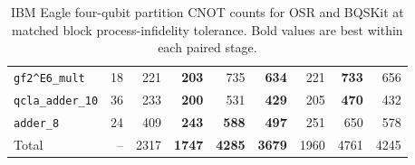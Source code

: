 \begin{table}[p]
\begin{tabular}{lrr|rrr|rrr}
\texttt{gf2\textasciicircum{}E6\_mult} & 18 & 221 & \textbf{203} & 735 & \textbf{634} & 221 & \textbf{733} & 656 \\
\texttt{qcla\_adder\_10} & 36 & 233 & \textbf{200} & 531 & \textbf{429} & 205 & \textbf{470} & 432 \\
\texttt{adder\_8} & 24 & 409 & \textbf{243} & \textbf{588} & \textbf{497} & 251 & 650 & 578 \\
\hline
Total & -- & 2317 & \textbf{1747} & \textbf{4285} & \textbf{3679} & 1960 & 4761 & 4245 \\
\hline
\end{tabular}
\caption{IBM Eagle four-qubit partition CNOT counts for OSR and BQSKit at matched block process-infidelity tolerance. Bold values are best within each paired stage.}
\label{tab:osr-bqskit-four-qubit-ibm-eagle-counts}
\end{table}

